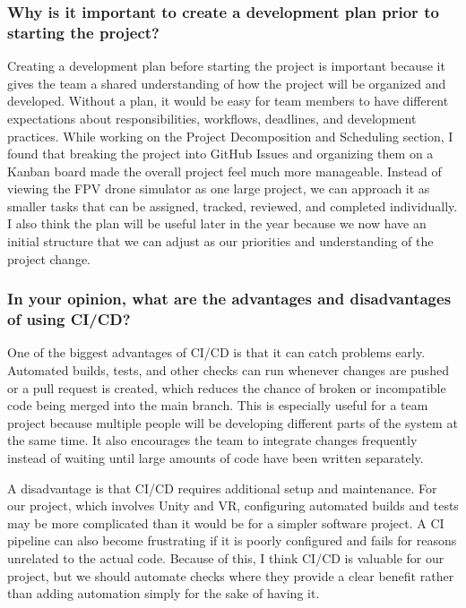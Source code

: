 \documentclass{article}
\begin{document}
\subsubsection*{Why is it important to create a development plan prior to starting the
    project?}

  Creating a development plan before starting the project is important because it gives the 
  team a shared understanding of how the project will be organized and developed. Without a plan, 
  it would be easy for team members to have different expectations about responsibilities, workflows, 
  deadlines, and development practices. While working on the Project Decomposition and Scheduling 
  section, I found that breaking the project into GitHub Issues and organizing them on a Kanban board 
  made the overall project feel much more manageable. Instead of viewing the FPV drone simulator as 
  one large project, we can approach it as smaller tasks that can be assigned, tracked, reviewed, and
   completed individually. I also think the plan will be useful later in the year because we now 
   have an initial structure that we can adjust as our priorities and understanding of the project
    change.
\subsubsection*{In your opinion, what are the advantages and disadvantages of using
    CI/CD?}
One of the biggest advantages of CI/CD is that it can catch problems early. Automated builds, tests, and 
other checks can run whenever changes are pushed or a pull request is created, which reduces the chance of 
broken or incompatible code being merged into the main branch. This is especially useful for a team project 
because multiple people will be developing different parts of the system at the same time. It also encourages 
the team to integrate changes frequently instead of waiting until large amounts of code have been written separately.

A disadvantage is that CI/CD requires additional setup and maintenance. For our project, which involves Unity and VR, 
configuring automated builds and tests may be more complicated than it would be for a simpler software project. A CI 
pipeline can also become frustrating if it is poorly configured and fails for reasons unrelated to the actual code. 
Because of this, I think CI/CD is valuable for our project, but we should automate checks where they provide a clear 
benefit rather than adding automation simply for the sake of having it.
\end{document}
